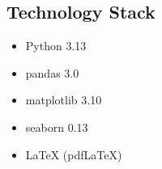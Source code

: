 \documentclass[12pt,a4paper]{article}
\begin{document}
\subsection{Technology Stack}

\begin{itemize}
    \item Python 3.13
    \item pandas 3.0
    \item matplotlib 3.10
    \item seaborn 0.13
    \item \LaTeX{} (pdf\LaTeX)
\end{itemize}
\end{document}
